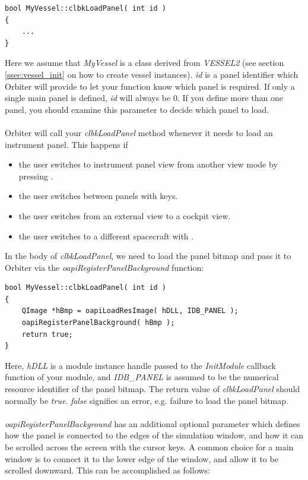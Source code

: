 \documentclass[Orbiter Developer Manual.tex]{subfiles}
\begin{document}
\begin{lstlisting}
bool MyVessel::clbkLoadPanel( int id )
{
	...
}
\end{lstlisting}

\noindent
Here we assume that \textit{MyVessel} is a class derived from \textit{VESSEL2} (see section \ref{ssec:vessel_init} on how to create vessel instances). \textit{id} is a panel identifier which Orbiter will provide to let your function know which panel is required. If only a single main panel is defined, \textit{id} will always be 0. If you define more than one panel, you should examine this parameter to decide which panel to load.\\
\\
Orbiter will call your \textit{clbkLoadPanel} method whenever it needs to load an instrument panel. This happens if

\begin{itemize}
\item the user switches to instrument panel view from another view mode by pressing .
\item the user switches between panels with \Ctrl\DArrow\UArrow\RArrow\LArrow keys.
\item the user switches from an external view to a cockpit view.
\item the user switches to a different spacecraft with .
\end{itemize}

\noindent
In the body of \textit{clbkLoadPanel}, we need to load the panel bitmap and pass it to Orbiter via the \textit{oapiRegisterPanelBackground} function:

\begin{lstlisting}
bool MyVessel::clbkLoadPanel( int id )
{
	QImage *hBmp = oapiLoadResImage( hDLL, IDB_PANEL );
	oapiRegisterPanelBackground( hBmp );
	return true;
}
\end{lstlisting}

\noindent
Here, \textit{hDLL} is a module instance handle passed to the \textit{InitModule} callback function of your module, and \textit{IDB\_PANEL} is assumed to be the numerical resource identifier of the panel bitmap. The return value of \textit{clbkLoadPanel} should normally be \textit{true}. \textit{false} signifies an error, e.g. failure to load the panel bitmap.\\
\\
\textit{oapiRegisterPanelBackground} has an additional optional parameter which defines how the panel is connected to the edges of the simulation window, and how it can be scrolled across the screen with the cursor keys. A common choice for a main window is to connect it to the lower edge of the window, and allow it to be scrolled downward. This can be accomplished as follows:
\end{document}

